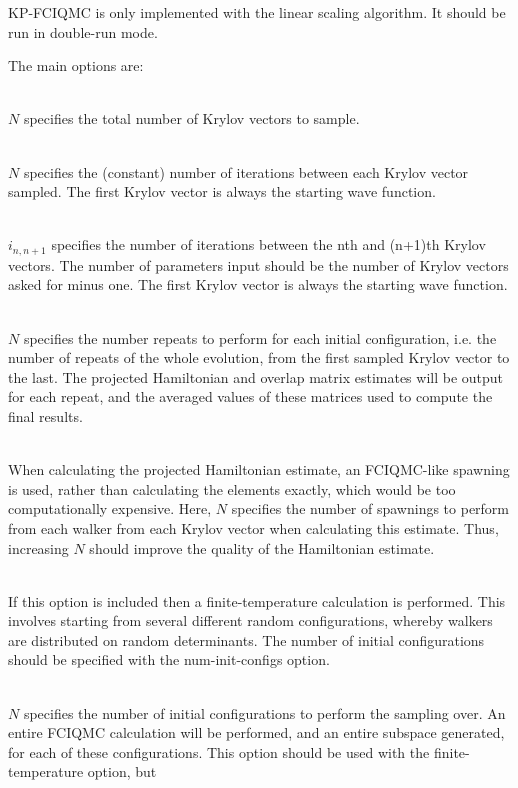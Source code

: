 \documentclass[a4paper,notitlepage]{scrreprt}
\newcommand\codeitem[1]{\needspace{1.5\baselineskip}\item[\textnormal{\ttfamily #1 \nopagebreak}] \hfill \\ \nopagebreak}
\begin{document}
    KP-FCIQMC is only implemented with the linear scaling algorithm. It should
    be run in double-run mode.

    The main options are:
    \begin{description}
        \codeitem{num-krylov-vecs $N$}
            $N$ specifies the total number of Krylov vectors to sample.
        \codeitem{num-iters-between-vecs $N$}
            $N$ specifies the (constant) number of iterations between each Krylov
            vector sampled. The first Krylov vector is always the starting wave
            function.
        \codeitem{num-iters-between-vecs-vary $i_{12}$, $i_{23}$, $i_{34}$...}
            $i_{n,n+1}$ specifies the number of iterations between the nth and
            (n+1)th Krylov vectors. The number of parameters input should be
            the number of Krylov vectors asked for minus one. The first Krylov
            vector is always the starting wave function.
        \codeitem{num-repeats-per-init-config $N$}
            $N$ specifies the number repeats to perform for each initial
            configuration, i.e. the number of repeats of the whole evolution,
            from the first sampled Krylov vector to the last. The projected
            Hamiltonian and overlap matrix estimates will be output for each
            repeat, and the averaged values of these matrices used to compute
            the final results.
        \codeitem{averagemcexcits-hamil $N$}
            When calculating the projected Hamiltonian estimate, an FCIQMC-like
            spawning is used, rather than calculating the elements exactly,
            which would be too computationally expensive. Here, $N$ specifies the
            number of spawnings to perform from each walker from each Krylov
            vector when calculating this estimate. Thus, increasing $N$ should
            improve the quality of the Hamiltonian estimate.
        \codeitem{finite-temperature}
            If this option is included then a finite-temperature calculation is
            performed. This involves starting from several different random
            configurations, whereby walkers are distributed on random
            determinants. The number of initial configurations should be
            specified with the num-init-configs option.
        \codeitem{num-init-configs $N$}
            $N$ specifies the number of initial configurations to perform the
            sampling over. An entire FCIQMC calculation will be performed, and
            an entire subspace generated, for each of these configurations.
            This option should be used with the finite-temperature option, but

\end{description}
\end{document}
